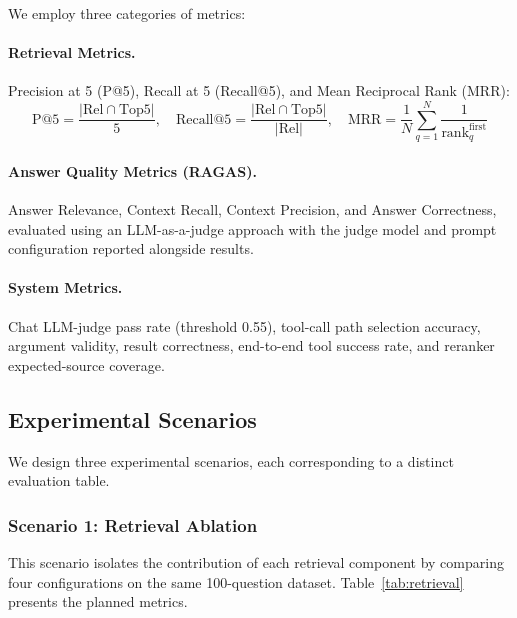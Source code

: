 \documentclass[runningheads]{llncs}
\begin{document}
We employ three categories of metrics:

\paragraph{Retrieval Metrics.} Precision at 5 (P@5), Recall at 5 (Recall@5), and Mean Reciprocal Rank (MRR):
\begin{equation}
    \text{P@5} = \frac{|\text{Rel} \cap \text{Top5}|}{5}, \quad
    \text{Recall@5} = \frac{|\text{Rel} \cap \text{Top5}|}{|\text{Rel}|}, \quad
    \text{MRR} = \frac{1}{N}\sum_{q=1}^{N}\frac{1}{\text{rank}^{\text{first}}_q}
    \label{eq:metrics}
\end{equation}

\paragraph{Answer Quality Metrics (RAGAS).} Answer Relevance, Context Recall, Context Precision, and Answer Correctness, evaluated using an LLM-as-a-judge approach with the judge model and prompt configuration reported alongside results.

\paragraph{System Metrics.} Chat LLM-judge pass rate (threshold 0.55), tool-call path selection accuracy, argument validity, result correctness, end-to-end tool success rate, and reranker expected-source coverage.

\subsection{Experimental Scenarios}
\label{sec:scenarios}

We design three experimental scenarios, each corresponding to a distinct evaluation table.

\subsubsection{Scenario 1: Retrieval Ablation}
This scenario isolates the contribution of each retrieval component by comparing four configurations on the same 100-question dataset. Table~\ref{tab:retrieval} presents the planned metrics.
\end{document}
